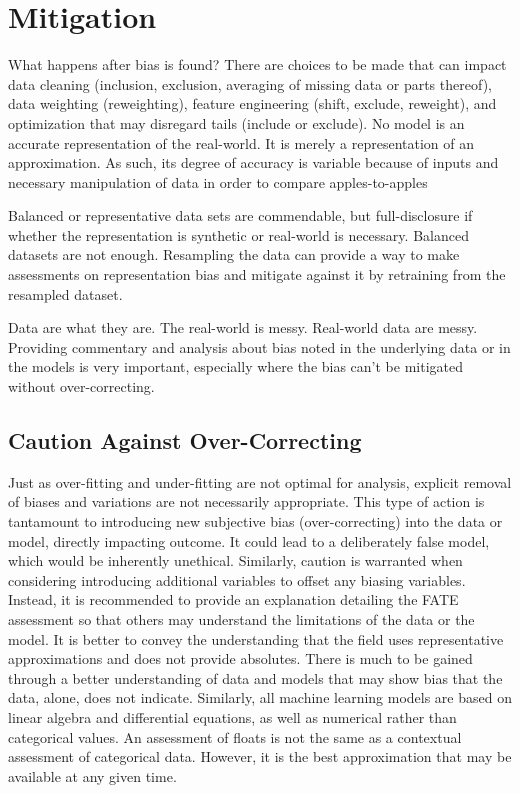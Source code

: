 \documentclass[conference]{IEEEtran}
\begin{document}
\section{Mitigation}
What happens after bias is found? There are choices to be made that can impact data cleaning (inclusion, exclusion, averaging of missing data or parts thereof), data weighting (reweighting), feature engineering (shift, exclude, reweight), and optimization that may disregard tails (include or exclude).
No model is an accurate representation of the real-world. It is merely a representation of an approximation. As such, its degree of accuracy is variable because of inputs and necessary manipulation of data in order to compare apples-to-apples

Balanced or representative data sets are commendable, but full-disclosure if whether the representation is synthetic or real-world is necessary. Balanced datasets are not enough.
Resampling the data can provide a way to make assessments on representation bias and mitigate against it by retraining from the resampled dataset.

Data are what they are. The real-world is messy. Real-world data are messy.
Providing commentary and analysis about bias noted in the underlying data or in the models is very important, especially where the bias can't be mitigated without over-correcting.

\subsection{Caution Against Over-Correcting}
Just as over-fitting and under-fitting are not optimal for analysis, explicit removal of biases and variations are not necessarily appropriate. This type of action is tantamount to introducing new subjective bias (over-correcting) into the data or model, directly impacting outcome. It could lead to a deliberately false model, which would be inherently unethical.
Similarly, caution is warranted when considering introducing additional variables to offset any biasing variables.
Instead, it is recommended to provide an explanation detailing the FATE assessment so that others may understand the limitations of the data or the model.
It is better to convey the understanding that the field uses representative approximations and does not provide absolutes. There is much to be gained through a better understanding of data and models that may show bias that the data, alone, does not indicate.
Similarly, all machine learning models are based on linear algebra and differential equations, as well as numerical rather than categorical values. An assessment of floats is not the same as a contextual assessment of categorical data. However, it is the best approximation that may be available at any given time.
\end{document}
